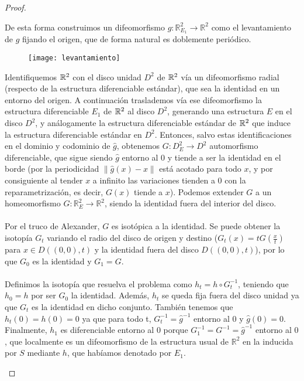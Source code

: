 \begin{proof}
\begin{enumerate}
			De esta forma construimos un difeomorfismo $\widehat{g}:\mathbb{R}^2_{E_1} \rightarrow \mathbb{R}^2$ como el levantamiento de $g$ fijando el origen, que de forma natural es doblemente periódico.\\
			
			\begin{figure}[h]
  				\centering
  				\texttt{[image: levantamiento]}
  				\label{fig:levantamiento}
			\end{figure}
			
			Identifiquemos $\mathbb{R}^2$ con el disco unidad $D^2$ de $\mathbb{R}^2$ vía un difeomorfismo radial (respecto de la estructura diferenciable estándar), que sea la identidad en un entorno del origen. A continuación traslademos vía ese difeomorfismo la estructura diferenciable $E_1$ de $\mathbb{R}^2$ al disco $D^2$, generando una estructura $E$ en el disco $D^2$, y análogamente la estructura diferenciable estándar de $\mathbb{R}^2$ que induce la estructura diferenciable estándar en $D^2$. Entonces, salvo estas identificaciones en el dominio y codominio de $\widehat{g}$, obtenemos $G:D^2_{E} \rightarrow D^2$ automorfismo diferenciable, que sigue siendo $\widehat{g}$ entorno al $0$ y tiende a ser la identidad en el borde (por la periodicidad $\|\widehat{g}(x) - x\|$ está acotado para todo $x$, y por consiguiente al tender $x$ a infinito las variaciones tienden a $0$ con la reparametrización, es decir, $G(x)$ tiende a $x$). Podemos extender $G$ a un homeomorfismo $G:\mathbb{R}^2_{E} \rightarrow \mathbb{R}^2$, siendo la identidad fuera del interior del disco.\\
			\\ Por el truco de Alexander, $G$ es isotópica a la identidad. Se puede obtener la isotopía $G_t$ variando el radio del disco de origen y destino ($G_t(x) = tG(\frac{x}{t})$ para $x \in D((0,0), t)$ y la identidad fuera del disco $D((0,0), t)$), por lo que $G_0$ es la identidad y $G_1=G$.\\
			\\ Definimos la isotopía que resuelva el problema como $h_t=h\circ G_t^{-1}$, teniendo que $h_0=h$ por ser $G_0$ la identidad. Además, $h_t$ se queda fija fuera del disco unidad ya que $G_t$ es la identidad en dicho conjunto. También tenemos que $h_t(0)=h(0)=0$ ya que para todo t, $G_t^{-1} = \widehat{g}^{-1}$ entorno al $0$ y $\widehat{g}(0)=0$. Finalmente, $h_1$ es diferenciable entorno al $0$ porque $G_1^{-1}=G^{-1} = \widehat{g}^{-1}$ entorno al $0$, que localmente es un difeomorfismo de la estructura usual de $\mathbb{R}^2$ en la inducida por $S$ mediante $h$, que habíamos denotado por $E_1$.

\end{enumerate}
\end{proof}
